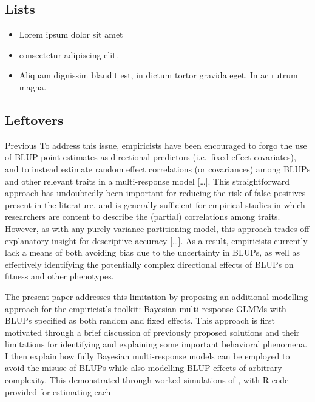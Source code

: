 \documentclass{article}
\begin{document}
\hypertarget{lists}{%
\subsection{Lists}\label{lists}}

\begin{itemize}
\tightlist
\item
  Lorem ipsum dolor sit amet
\item
  consectetur adipiscing elit.
\item
  Aliquam dignissim blandit est, in dictum tortor gravida eget. In ac
  rutrum magna.
\end{itemize}

\hypertarget{leftovers}{%
\subsection{Leftovers}\label{leftovers}}

Previous To address this issue, empiricists have been encouraged to
forgo the use of BLUP point estimates as directional predictors
(i.e.~fixed effect covariates), and to instead estimate random effect
correlations (or covariances) among BLUPs and other relevant traits in a
multi-response model {[}\ldots{]}. This straightforward approach has
undoubtedly been important for reducing the risk of false positives
present in the literature, and is generally sufficient for empirical
studies in which researchers are content to describe the (partial)
correlations among traits. However, as with any purely
variance-partitioning model, this approach trades off explanatory
insight for descriptive accuracy {[}\ldots{]}. As a result, empiricists
currently lack a means of both avoiding bias due to the uncertainty in
BLUPs, as well as effectively identifying the potentially complex
directional effects of BLUPs on fitness and other phenotypes.

The present paper addresses this limitation by proposing an additional
modelling approach for the empiricist's toolkit: Bayesian multi-response
GLMMs with BLUPs specified as both random and fixed effects. This
approach is first motivated through a brief discussion of previously
proposed solutions and their limitations for identifying and explaining
some important behavioral phenomena. I then explain how fully Bayesian
multi-response models can be employed to avoid the misuse of BLUPs while
also modelling BLUP effects of arbitrary complexity. This demonstrated
through worked simulations of , with R code provided for estimating each
\end{document}
